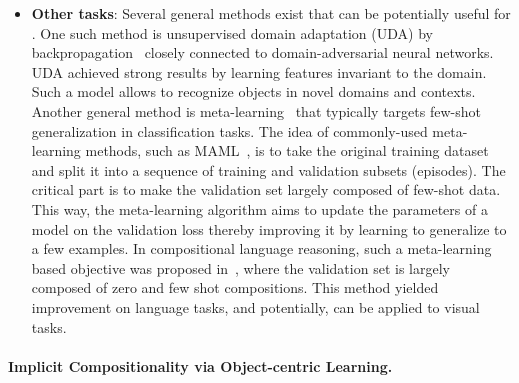 \begin{itemize}[leftmargin=5mm]
    \item \textbf{Other tasks}: Several general methods exist that can be potentially useful for \cgshort. One such method is unsupervised domain adaptation (UDA) by backpropagation~\citep{ganin2015unsupervised} closely connected to domain-adversarial neural networks\citep{ajakan2014domain,JMLR:v17:15-239}. UDA achieved strong results by learning features invariant to the domain. Such a model allows to recognize objects in novel domains and contexts.
    Another general method is meta-learning~\citep{hospedales2020meta} that typically targets few-shot generalization in classification tasks. 
    The idea of commonly-used meta-learning methods, such as MAML~\citep{finn2017model}, is to take the original training dataset and split it into a sequence of training and validation subsets (episodes). The critical part is to make the validation set largely composed of few-shot data. This way, the meta-learning algorithm aims to update the parameters of a model on the validation loss thereby improving it by learning to generalize to a few examples. In compositional language reasoning, such a meta-learning based objective was proposed in~\citep{lake2019compositional}, where the validation set is largely composed of zero and few shot compositions. This method yielded improvement \cgshort on language tasks, and potentially, can be applied to visual tasks.
\end{itemize}


\paragraph{Implicit Compositionality via Object-centric Learning.}

